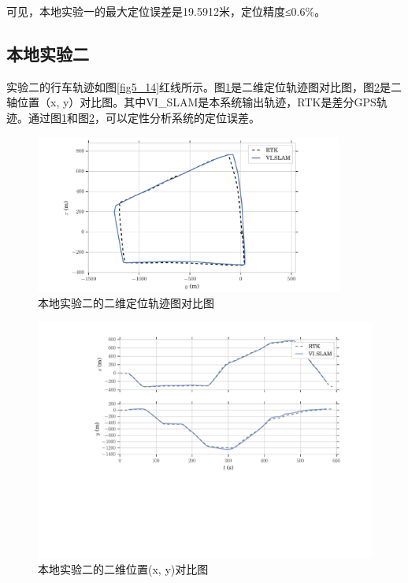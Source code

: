 可见，本地实验一的最大定位误差是19.5912米，定位精度≤0.6\%。\newpage
\subsection{本地实验二}
实验二的行车轨迹如图\ref{fig5_14}红线所示。图\ref{fig5_19}是二维定位轨迹图对比图，图\ref{fig5_20}是二轴位置（x, y）对比图。其中VI\_SLAM是本系统输出轨迹，RTK是差分GPS轨迹。通过图\ref{fig5_19}和图\ref{fig5_20}，可以定性分析系统的定位误差。
\begin{figure}[h]\setlength{\belowcaptionskip}{-12pt}
	\centering
	\includegraphics[width=0.90\textwidth]{figures/chapter5/traject_5km}
	\caption{本地实验二的二维定位轨迹图对比图}\label{fig5_19}
\end{figure}
\begin{figure}[h]\setlength{\belowcaptionskip}{-12pt}
	\centering
	\includegraphics[width=1.0\textwidth]{figures/chapter5/xy_5km}
	\caption{本地实验二的二维位置(x, y)对比图}\label{fig5_20}
\end{figure}

